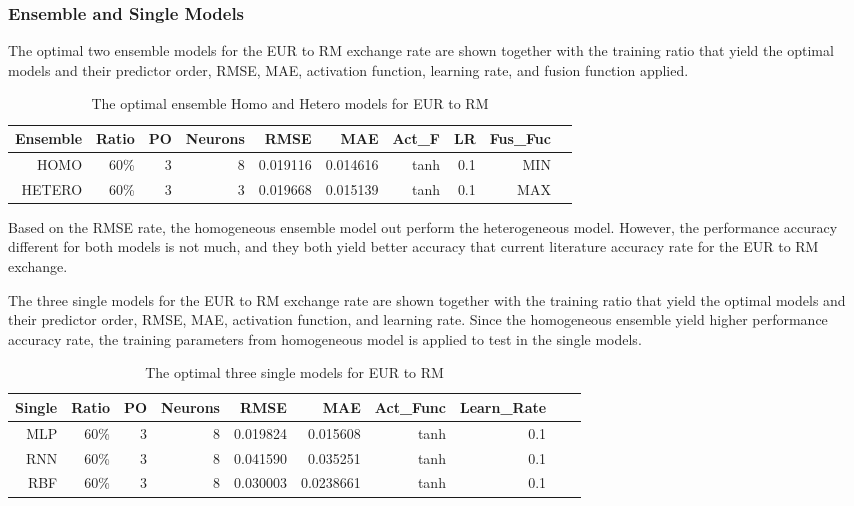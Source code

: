 {{{{{{{{{{{{{{{{\subsubsection{Ensemble and Single Models}

The optimal two ensemble models for the EUR to RM exchange rate are shown together with the training ratio that yield the optimal models and their predictor order, RMSE, MAE, activation function, learning rate, and fusion function applied.

\begin{table}[ht]
	\centering
	\begin{tabular}{@{}rrrrrrrrrr@{}}
		\toprule
		\textbf{Ensemble} &\textbf{Ratio}&\textbf{PO}&\textbf{Neurons}& \textbf{RMSE} & \textbf{MAE} & \textbf{Act\_F} & \textbf{LR} &\textbf{ Fus\_Fuc}\\ 
		\midrule
		HOMO	& 60\% & 3 & 8 & 0.019116 & 0.014616 & tanh & 0.1 & MIN \\ 	
		HETERO	& 60\% & 3 & 3 & 0.019668 & 0.015139 & tanh & 0.1 & MAX \\
		
		\hline
	\end{tabular}
	\hspace*{1cm}
	\caption{The optimal ensemble  Homo and Hetero models for EUR to RM }
\end{table}

Based on the RMSE rate, the homogeneous ensemble model out perform the heterogeneous model. However, the performance accuracy different for both models is not much, and they both yield better accuracy that current literature accuracy rate for the EUR to RM exchange.

The three  single models for the EUR to RM exchange rate are shown together with the training ratio that yield the optimal models and their predictor order, RMSE, MAE, activation function, and learning rate. Since the homogeneous ensemble yield higher performance accuracy rate, the training parameters from homogeneous model is applied to test in the single models.

\begin{table}[ht]
	\centering
	\begin{tabular}{@{}rrrrrrrrrr@{}}
		\toprule
		\textbf{Single} &\textbf{Ratio}&\textbf{PO}&\textbf{Neurons}& \textbf{RMSE} & \textbf{MAE} & \textbf{Act\_Func} & \textbf{Learn\_Rate} \\ 
		\midrule
			MLP	& 60\% & 3 & 8 & 0.019824 &  0.015608 & tanh & 0.1 \\	
			RNN	& 60\% & 3 & 8 & 0.041590 & 0.035251 & tanh & 0.1 \\
			RBF	& 60\% & 3 & 8 & 0.030003 & 0.0238661 & tanh & 0.1  \\
			\hline
	\end{tabular}
	\hspace*{1cm}
	\caption{The optimal three single models for EUR to RM }
\end{table}

}}}}}}}}}}}}}}}}
